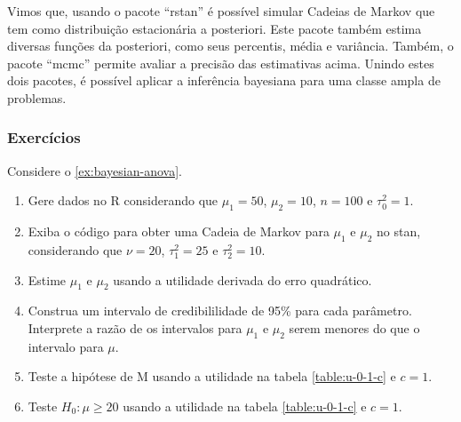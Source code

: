 Vimos que, usando o pacote ``rstan''
é possível simular Cadeias de Markov que tem
como distribuição estacionária a posteriori.
Este pacote também estima diversas funções da posteriori,
como seus percentis, média e variância.
Também, o pacote ``mcmc'' permite avaliar a
precisão das estimativas acima.
Unindo estes dois pacotes, é possível aplicar a
inferência bayesiana para uma classe ampla de problemas.

\subsubsection{Exercícios}

\begin{exercise}
 \label{ex:anova-stan}
 Considere o \cref{ex:bayesian-anova}.
 \begin{enumerate}[label=(\alph*)]
  \item Gere dados no R considerando que $\mu_{1}=50$, $\mu_{2}=10$, $n=100$ e $\tau_{0}^{2}=1$.
	\item Exiba o código para obter uma Cadeia de Markov para $\mu_{1}$ e $\mu_{2}$ no stan,
	      considerando que $\nu = 20$, $\tau_{1}^{2}=25$ e $\tau_{2}^{2}=10$.
	\item Estime $\mu_{1}$ e $\mu_{2}$ usando a utilidade derivada do erro quadrático.
	\item Construa um intervalo de credibililidade de 95\% para cada parâmetro.
	      Interprete a razão de os intervalos para $\mu_{1}$ e $\mu_{2}$ serem menores 
				do que o intervalo para $\mu$.
	\item Teste a hipótese de M usando a utilidade na tabela \ref{table:u-0-1-c} e $c=1$.
	\item Teste $H_{0}: \mu \geq 20$ usando a utilidade na tabela \ref{table:u-0-1-c} e $c=1$.
 \end{enumerate}
\end{exercise}

